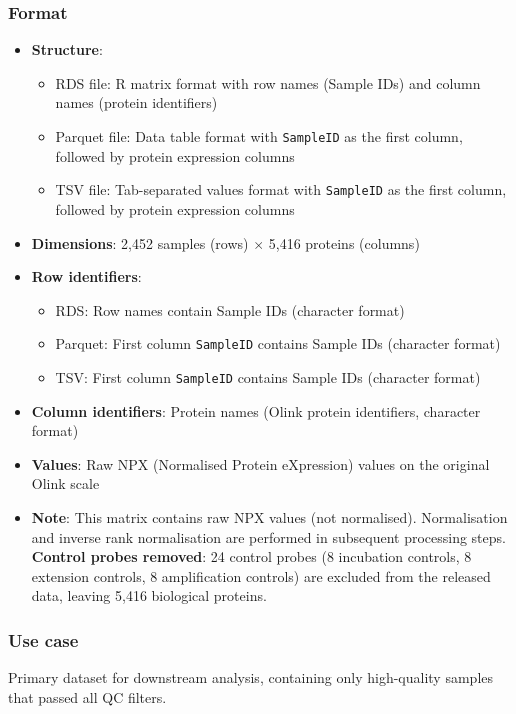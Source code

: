 \documentclass[11pt,a4paper]{article}
\begin{document}
\subsubsection{Format}
\begin{itemize}
\item \textbf{Structure}:
  \begin{itemize}
    \item RDS file: R matrix format with row names (Sample IDs) and column names (protein identifiers)
    \item Parquet file: Data table format with \texttt{SampleID} as the first column, followed by protein expression columns
    \item TSV file: Tab-separated values format with \texttt{SampleID} as the first column, followed by protein expression columns
  \end{itemize}
\item \textbf{Dimensions}: 2,452 samples (rows) $\times$ 5,416 proteins (columns)
\item \textbf{Row identifiers}:
  \begin{itemize}
    \item RDS: Row names contain Sample IDs (character format)
    \item Parquet: First column \texttt{SampleID} contains Sample IDs (character format)
    \item TSV: First column \texttt{SampleID} contains Sample IDs (character format)
  \end{itemize}
\item \textbf{Column identifiers}: Protein names (Olink protein identifiers, character format)
\item \textbf{Values}: Raw NPX (Normalised Protein eXpression) values on the original Olink scale
\item \textbf{Note}: This matrix contains raw NPX values (not normalised). Normalisation and inverse rank normalisation are performed in subsequent processing steps. \textbf{Control probes removed}: 24 control probes (8 incubation controls, 8 extension controls, 8 amplification controls) are excluded from the released data, leaving 5,416 biological proteins.
\end{itemize}

\subsubsection{Use case}
Primary dataset for downstream analysis, containing only high-quality samples that passed all QC filters.
\end{document}
